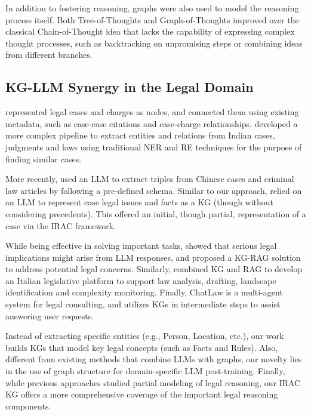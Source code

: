 In addition to fostering reasoning, graphs were also used to model the reasoning process itself. Both Tree-of-Thoughts \cite{yao2023tree} and Graph-of-Thoughts \cite{besta2024got} improved over the classical Chain-of-Thought idea that lacks the capability of expressing complex thought processes, such as backtracking on unpromising steps or combining ideas from different branches.

\subsection{KG-LLM Synergy in the Legal Domain}
\label{section:kg_llm_legal}

\citet{tang2024caselink} represented legal cases and charges as nodes, and connected them using existing metadata, such as case-case citations and case-charge relationships. \citet{dhani2021similar} developed a more complex pipeline to extract entities and relations from Indian cases, judgments and laws using traditional NER and RE techniques for the purpose of finding similar cases. 

More recently, \citet{chen2024leverage} used an LLM to extract triples from Chinese cases and criminal law articles by following a pre-defined schema.
Similar to our approach, \citet{tang2024casegnn++,tang2024casegnn} relied on an LLM to represent case legal issues and facts as a KG (though without considering precedents). This offered an initial, though partial, representation of a case via the IRAC framework.

While being effective in solving important tasks, \citet{HANNAH2025100843} showed that serious legal implications might arise from LLM responses, and proposed a KG-RAG solution to address potential legal concerns. Similarly, \citet{10.1145/3627673.3680268} combined KG and RAG to develop an Italian legislative platform to support law analysis, drafting, landscape identification and complexity monitoring. Finally, ChatLaw \cite{DBLP:journals/corr/abs-2306-16092} is a multi-agent system for legal consulting, and utilizes KGs in intermediate steps to assist answering user requests.

Instead of extracting specific entities (e.g., Person, Location, etc.), our work builds KGs that model key legal concepts (such as Facts and Rules). Also, different from existing methods that combine LLMs with graphs, our novelty lies in the use of graph structure for domain-specific LLM post-training. Finally, while previous approaches studied partial modeling of legal reasoning, our IRAC KG offers a more comprehensive coverage of the important legal reasoning components.
